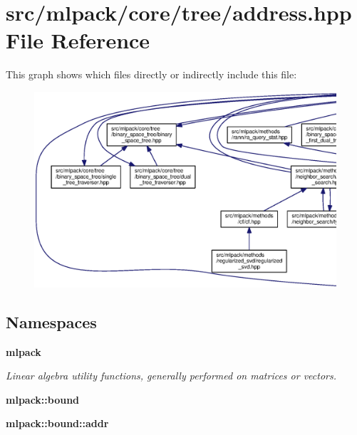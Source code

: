 \section{src/mlpack/core/tree/address.hpp File Reference}
\label{address_8hpp}
This graph shows which files directly or indirectly include this file\+:
\nopagebreak
\begin{figure}[H]
\begin{center}
\leavevmode
\includegraphics[width=350pt]{address_8hpp__dep__incl}
\end{center}
\end{figure}
\subsection*{Namespaces}
\begin{DoxyCompactItemize}
\item 
 {\bf mlpack}
\begin{DoxyCompactList}\small\item\em Linear algebra utility functions, generally performed on matrices or vectors. \end{DoxyCompactList}\item 
 {\bf mlpack\+::bound}
\item 
 {\bf mlpack\+::bound\+::addr}
\end{DoxyCompactItemize}
